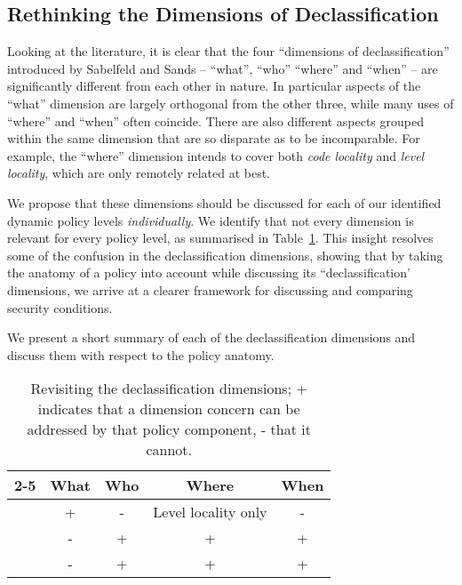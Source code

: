 \subsection{Rethinking the Dimensions of Declassification}
\label{sec:pollang:reclassify}

Looking at the literature, it is clear that the four ``dimensions of declassification'' introduced
by Sabelfeld and Sands \cite{Sabelfeld:Sands:JCS} -- ``what'', ``who'' ``where'' and ``when'' --
are significantly different from each other in nature.
In particular aspects of the ``what'' dimension are largely orthogonal from the other three,
while many uses of ``where'' and ``when'' often coincide. There are also
different aspects grouped within the same dimension that are so disparate as to be incomparable.
For example, the ``where'' dimension intends to cover both \emph{code locality} and \emph{level locality},
which are only remotely related at best.

We propose that these dimensions should be discussed for each of our identified dynamic policy levels 
\emph{individually}. We identify that not every dimension is relevant for every policy level, as 
summarised in Table~\ref{tbl:decldimensions}.
This insight resolves some of the confusion in the declassification dimensions,
showing that by taking the anatomy of a policy into account while discussing its 
``declassification' dimensions, we arrive at a clearer framework for discussing and comparing 
security conditions.

We present a short summary of each of the declassification dimensions and discuss them with respect to the policy anatomy.

\begin{table}
\begin{center}
  \begin{tabular}{@{}|l|*{4}{c}|@{}}
    \cline{2-5}
    \multicolumn{1}{ c|  }{} & What & Who & Where & When \\ 
    \hline
    \orderings{} & + & - &  Level locality only & - \\
    \dynamicpol{} & - & + & + & + \\
    \metapol{} & - & + & + & + \\ \hline
  \end{tabular}
\end{center}
\vspace*{0.7ex}
\caption{Revisiting the declassification dimensions; + indicates that a dimension concern can be addressed by that policy component, - that it cannot.}
\label{tbl:decldimensions}
\end{table}

